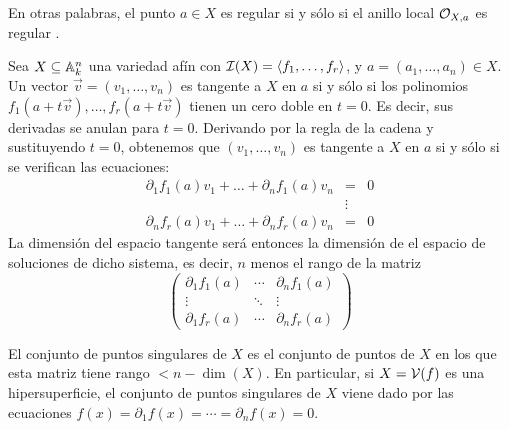 \documentclass[ACGA.tex]{subfiles}
\begin{document}
En otras palabras, el punto $a\in X$ es regular si y sólo si el anillo local ${\cal O}_{X,a}$ es regular \cite[Capítulo 11]{am}.

Sea $X\subseteq\mathbb{A}^n_k$ una variedad afín con $\mathcal{I}(X)=\langle f_1,\ldots,f_r\rangle$, y $a=(a_1,\ldots,a_n)\in X$. Un vector $\overrightarrow v=(v_1,\ldots,v_n)$ es tangente a $X$ en $a$ si y sólo si los polinomios $f_1(a+t\overrightarrow v),\ldots,f_r(a+t\overrightarrow v)$ tienen un cero doble en $t=0$. Es decir, sus derivadas se anulan para $t=0$. Derivando por la regla de la cadena y sustituyendo $t=0$, obtenemos que $(v_1,\ldots,v_n)$ es tangente a $X$ en $a$ si y sólo si se verifican las ecuaciones:
$$
\begin{array}{rcl}
\partial_1f_1(a)v_1+\ldots+\partial_nf_1(a)v_n & = & 0 \\
 & \vdots & \\
\partial_nf_r(a)v_1+\ldots+\partial_nf_r(a)v_n & = & 0
\end{array}
$$
La dimensión del espacio tangente será entonces la dimensión de el espacio de soluciones de dicho sistema, es decir, $n$ menos el rango de la matriz
\begin{equation}\label{matrizjacobiana}
\left(\begin{array}{ccc}
       \partial_1f_1(a) & \cdots & \partial_nf_1(a) \\
\vdots & \ddots & \vdots \\
\partial_1f_r(a) & \cdots & \partial_nf_r(a)
      \end{array}
\right)
\end{equation}

El conjunto de puntos singulares de $X$ es el conjunto de puntos de $X$ en los que esta matriz tiene rango $<n-\dim(X)$. En particular, si $X=\mathcal{V}(f)$ es una hipersuperficie, el conjunto de puntos singulares de $X$ viene dado por las ecuaciones $f(x)=\partial_1f(x)=\cdots=\partial_nf(x)=0$.
\end{document}
